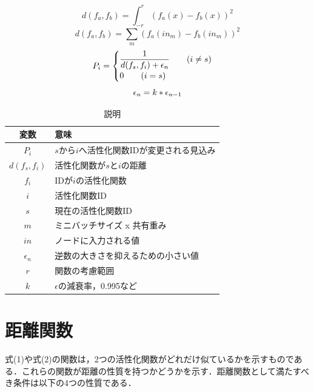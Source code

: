 \documentclass[dvipdfmx]{jarticle}
\begin{document}
\begin{equation}
    d(f_{a}, f_{b}) = \int^{r}_{-r} (f_{a}(x) - f_{b}(x))^{2}
\end{equation}
\begin{equation}
    d(f_{a}, f_{b}) = \sum_{m}(f_{a}(in_{m}) - f_{b}(in_{m}))^2
\end{equation}
\begin{equation}
    P_{i} =  \begin{cases} \dfrac{1}{d(f_{s}, f_{i}) + \epsilon_{n} } \qquad (i \neq s) \\ 0 \qquad (i = s) \end{cases}\\
\end{equation}
\begin{equation}
    \epsilon_{n} = k * \epsilon_{n-1} \\
\end{equation}

\begin{table}[h]
    \caption{説明}
    \centering
    \begin{tabular}{cl}
        \hline
        変数  & 意味 \\
        \hline \hline
        $P_{i}$               & $s$から$i$へ活性化関数IDが変更される見込み \\
        $d(f_{s}, f_{i})$     & 活性化関数が$s$と$i$の距離                 \\
        $f_{i}$               & IDが$i$の活性化関数                        \\
        $i$                   & 活性化関数ID                               \\
        $s$                   & 現在の活性化関数ID                         \\
        $m$                   & ミニバッチサイズ x 共有重み                \\
        $in$                  & ノードに入力される値                       \\
        $\epsilon_{n}$        & 逆数の大きさを抑えるための小さい値         \\
        $r$                   & 関数の考慮範囲                             \\
        $k$                   & $\epsilon$の減衰率，0.995など              \\
        \hline
    \end{tabular}
\end{table}

\section{距離関数}
式(1)や式(2)の関数は，2つの活性化関数がどれだけ似ているかを示すものである．これらの関数が距離の性質を持つかどうかを示す．距離関数として満たすべき条件は以下の4つの性質である．
\end{document}
